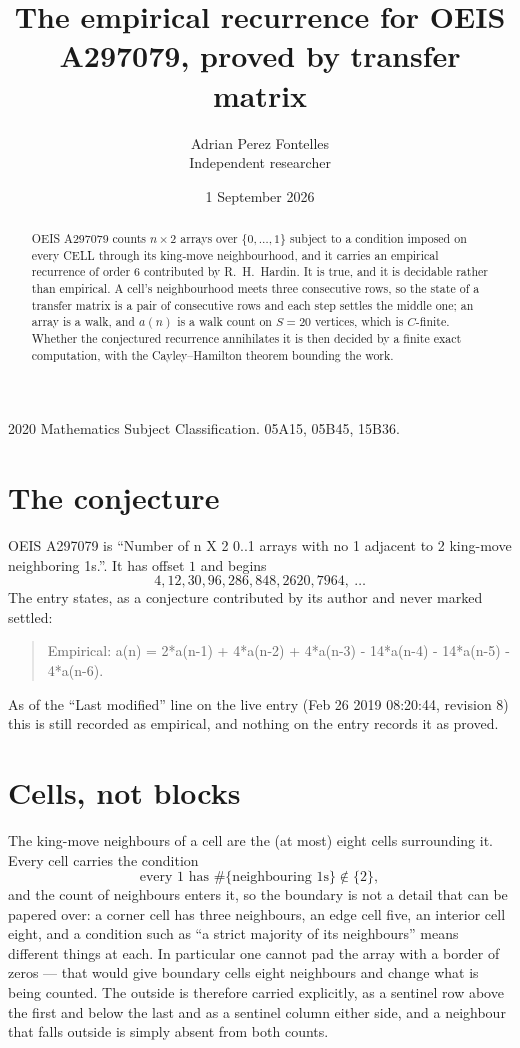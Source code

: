 \documentclass[11pt,a4paper]{article}
\title{The empirical recurrence for OEIS A297079, proved by transfer matrix}
\author{Adrian Perez Fontelles\\ \small Independent researcher}
\date{1 September 2026}
\theoremstyle{plain}
\theoremstyle{definition}
\begin{document}
\maketitle

\begin{abstract}
OEIS A297079 counts $n\times2$ arrays over $\{0,\dots,1\}$ subject to a condition imposed on
every CELL through its king-move neighbourhood, and it carries an empirical recurrence of
order $6$ contributed by R.~H.~Hardin. It is true, and it is decidable rather than
empirical. A cell's neighbourhood meets three consecutive rows, so the state of a transfer
matrix is a pair of consecutive rows and each step settles the middle one; an array is a
walk, and $a(n)$ is a walk count on $S=20$ vertices, which is $C$-finite. Whether the
conjectured recurrence annihilates it is then decided by a finite exact computation, with the
Cayley--Hamilton theorem bounding the work.
\end{abstract}

\noindent\small 2020 Mathematics Subject Classification. 05A15, 05B45, 15B36.\normalsize

\section{The conjecture}

OEIS A297079 is ``Number of n X 2 0..1 arrays with no 1 adjacent to 2 king-move neighboring 1s.''. It has offset $1$ and begins
\[
4, 12, 30, 96, 286, 848, 2620, 7964,\ \dots
\]
The entry states, as a conjecture contributed by its author and never marked settled:
\begin{quote}
Empirical: a(n) = 2*a(n-1) + 4*a(n-2) + 4*a(n-3) - 14*a(n-4) - 14*a(n-5) - 4*a(n-6).
\end{quote}
As of the ``Last modified'' line on the live entry (Feb 26 2019 08:20:44, revision 8) this is still
recorded as empirical, and nothing on the entry records it as proved.

\section{Cells, not blocks}

The king-move neighbours of a cell are the (at most) eight cells surrounding it. Every cell
carries the condition
\[
\text{every }1\text{ has }\#\{\text{neighbouring }1\text{s}\}\notin\{2\},
\]
and the count of neighbours enters it, so the boundary is not a detail that can be papered
over: a corner cell has three neighbours, an edge cell five, an interior cell eight, and a
condition such as ``a strict majority of its neighbours'' means different things at each. In
particular one cannot pad the array with a border of zeros --- that would give boundary cells
eight neighbours and change what is being counted. The outside is therefore carried
explicitly, as a sentinel row above the first and below the last and as a sentinel column
either side, and a neighbour that falls outside is simply absent from both counts.
\end{document}
